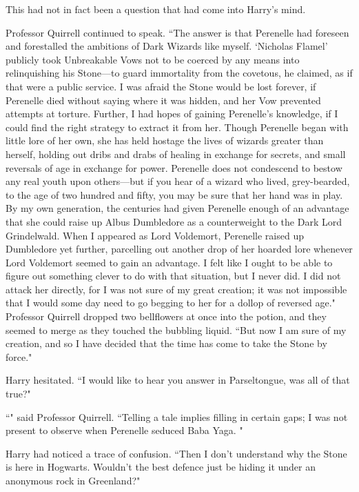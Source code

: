 This had not in fact been a question that had come into Harry's mind.

Professor Quirrell continued to speak. ``The answer is that Perenelle had foreseen and forestalled the ambitions of Dark Wizards like myself. `Nicholas Flamel' publicly took Unbreakable Vows not to be coerced by any means into relinquishing his Stone—to guard immortality from the covetous, he claimed, as if that were a public service. I was afraid the Stone would be lost forever, if Perenelle died without saying where it was hidden, and her Vow prevented attempts at torture. Further, I had hopes of gaining Perenelle's knowledge, if I could find the right strategy to extract it from her. Though Perenelle began with little lore of her own, she has held hostage the lives of wizards greater than herself, holding out dribs and drabs of healing in exchange for secrets, and small reversals of age in exchange for power. Perenelle does not condescend to bestow any real youth upon others—but if you hear of a wizard who lived, grey-bearded, to the age of two hundred and fifty, you may be sure that her hand was in play. By my own generation, the centuries had given Perenelle enough of an advantage that she could raise up Albus Dumbledore as a counterweight to the Dark Lord Grindelwald. When I appeared as Lord Voldemort, Perenelle raised up Dumbledore yet further, parcelling out another drop of her hoarded lore whenever Lord Voldemort seemed to gain an advantage. I felt like I ought to be able to figure out something clever to do with that situation, but I never did. I did not attack her directly, for I was not sure of my great creation; it was not impossible that I would some day need to go begging to her for a dollop of reversed age." Professor Quirrell dropped two bellflowers at once into the potion, and they seemed to merge as they touched the bubbling liquid. ``But now I am sure of my creation, and so I have decided that the time has come to take the Stone by force."

Harry hesitated. ``I would like to hear you answer in Parseltongue, was all of that true?"

``" said Professor Quirrell. ``Telling a tale implies filling in certain gaps; I was not present to observe when Perenelle seduced Baba Yaga. "

Harry had noticed a trace of confusion. ``Then I don't understand why the Stone is here in Hogwarts. Wouldn't the best defence just be hiding it under an anonymous rock in Greenland?"

